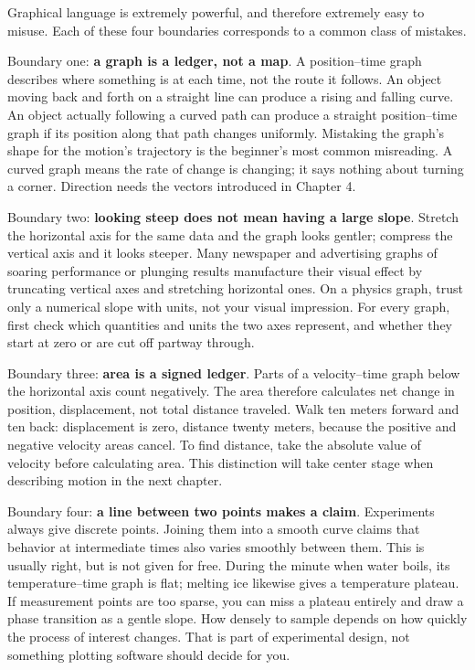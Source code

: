 
Graphical language is extremely powerful, and therefore extremely easy to misuse. Each of these four boundaries corresponds to a common class of mistakes.

Boundary one: \textbf{a graph is a ledger, not a map}. A position--time graph describes where something is at each time, not the route it follows. An object moving back and forth on a straight line can produce a rising and falling curve. An object actually following a curved path can produce a straight position--time graph if its position along that path changes uniformly. Mistaking the graph's shape for the motion's trajectory is the beginner's most common misreading. A curved graph means the rate of change is changing; it says nothing about turning a corner. Direction needs the vectors introduced in Chapter 4.

Boundary two: \textbf{looking steep does not mean having a large slope}. Stretch the horizontal axis for the same data and the graph looks gentler; compress the vertical axis and it looks steeper. Many newspaper and advertising graphs of soaring performance or plunging results manufacture their visual effect by truncating vertical axes and stretching horizontal ones. On a physics graph, trust only a numerical slope with units, not your visual impression. For every graph, first check which quantities and units the two axes represent, and whether they start at zero or are cut off partway through.

Boundary three: \textbf{area is a signed ledger}. Parts of a velocity--time graph below the horizontal axis count negatively. The area therefore calculates net change in position, displacement, not total distance traveled. Walk ten meters forward and ten back: displacement is zero, distance twenty meters, because the positive and negative velocity areas cancel. To find distance, take the absolute value of velocity before calculating area. This distinction will take center stage when describing motion in the next chapter.

Boundary four: \textbf{a line between two points makes a claim}. Experiments always give discrete points. Joining them into a smooth curve claims that behavior at intermediate times also varies smoothly between them. This is usually right, but is not given for free. During the minute when water boils, its temperature--time graph is flat; melting ice likewise gives a temperature plateau. If measurement points are too sparse, you can miss a plateau entirely and draw a phase transition as a gentle slope. How densely to sample depends on how quickly the process of interest changes. That is part of experimental design, not something plotting software should decide for you.

